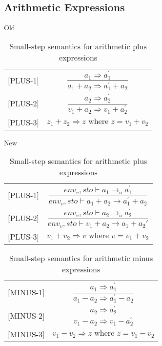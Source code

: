 \subsection{Arithmetic Expressions}
Old
\begin{table}[H]
    \centering
    \begin{longtable}[c] { r c }
        [PLUS-1] & \( \dfrac{a_1 \Rightarrow a^{'}_{1}}{a_1 + a_2 \Rightarrow a^{'}_{1} + a_2} \) \\
        
        [PLUS-2] & \( \dfrac{a_2 \Rightarrow a^{'}_{2}}{v_1 + a_2 \Rightarrow v_1 + a^{'}_{2}} \) \\
        
        [PLUS-3] & \(z_1 + z_2 \Rightarrow z \text{ where } z = v_1 + v_2\) \\
    \end{longtable}
    \caption{Small-step semantics for arithmetic plus expressions}\label{tab:sss_aud}
\end{table}
New
\begin{table}[H]
    \centering
    \begin{longtable}[c] { r c }
        [PLUS-1] & \( \dfrac{ env_v,sto \vdash a_1 \rightarrow_a a^{'}_{1}}{env_v,sto \vdash a_1 + a_2 \rightarrow a^{'}_{1} + a_2} \) \\
        
        [PLUS-2] & \( \dfrac{ env_v,sto \vdash a_2 \rightarrow_a a^{'}_{2}}{env_v,sto \vdash v_1 + a_2 \rightarrow a_{1} + a_2{'}} \) \\
        
        [PLUS-3] & \(v_1 + v_2 \Rightarrow v \text{ where } v = v_1 + v_2\) \\
    \end{longtable}
    \caption{Small-step semantics for arithmetic plus expressions}\label{tab:sss_aud}
\end{table}
\begin{table}[H]
    \centering
    \begin{longtable}[c] { r c }
        
        [MINUS-1] & \( \dfrac{a_1 \Rightarrow a^{'}_{1}}{a_1 - a_2 \Rightarrow a^{'}_{1} - a_2} \) \\
        
        [MINUS-2] & \( \dfrac{a_2 \Rightarrow a^{'}_{2}}{v_1 - a_2 \Rightarrow v_1 - a^{'}_{2}} \) \\
        
        [MINUS-3] & \(v_1 - v_2 \Rightarrow z \text{ where } z = v_1 - v_2\) \\
        
        
    \end{longtable}
    \caption{Small-step semantics for arithmetic minus expressions}\label{tab:sss_aud}
\end{table}
